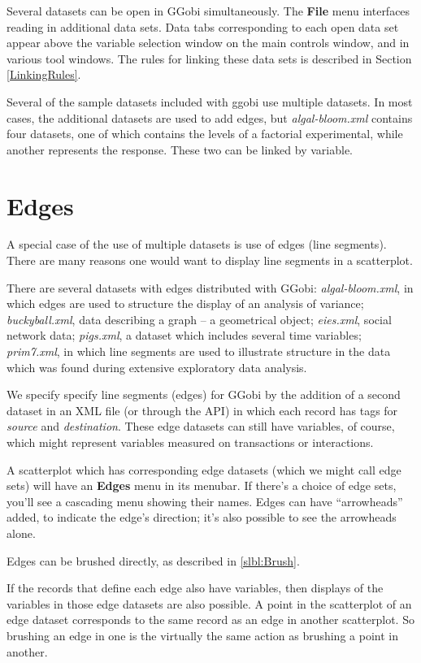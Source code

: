 \documentclass[11pt]{article}
\def\Widget#1{\textbf{#1}}
\def\File#1{\textsl{#1}}
\begin{document}
{Several datasets can be open in GGobi simultaneously. The \Widget{File}
menu interfaces reading in additional data sets. Data tabs corresponding
to each open data set appear above the variable selection window on
the main controls window, and in various tool windows. The rules for
linking these data sets is described in Section \ref{LinkingRules}.

Several of the sample datasets included with ggobi use multiple
datasets.  In most cases, the additional datasets are used to add
edges, but \File{algal-bloom.xml} contains four datasets, one of which
contains the levels of a factorial experimental, while another
represents the response.  These two can be linked by variable.

\section{Edges}

A special case of the use of multiple datasets is use of edges (line
segments).  There are many reasons one would want to display line segments
in a scatterplot. 

There are several datasets with edges distributed with GGobi:
\File{algal-bloom.xml}, in which edges are used to structure the
display of an analysis of variance; \File{buckyball.xml}, data
describing a graph -- a geometrical object; \File{eies.xml}, social
network data; \File{pigs.xml}, a dataset which includes several time
variables; \File{prim7.xml}, in which line segments are used to
illustrate structure in the data which was found during extensive
exploratory data analysis.

We specify specify line segments (edges) for GGobi by the addition of a
second dataset in an XML file (or through the API) in which each record
has tags for {\it source} and {\it destination}.  These edge datasets
can still have variables, of course, which might represent variables
measured on transactions or interactions.

A scatterplot which has corresponding edge datasets (which we might call
edge sets) will have an \Widget{Edges} menu in its menubar.  If there's a
choice of edge sets, you'll see a cascading menu showing their names.
Edges can have ``arrowheads'' added, to indicate the edge's direction;
it's also possible to see the arrowheads alone.

Edges can be brushed directly, as described in \ref{slbl:Brush}.

If the records that define each edge also have variables, then
displays of the variables in those edge datasets are also possible.
A point in the scatterplot of an edge dataset corresponds to the
same record as an edge in another scatterplot.  So brushing an
edge in one is the virtually the same action as brushing a point
in another.

}
\end{document}
